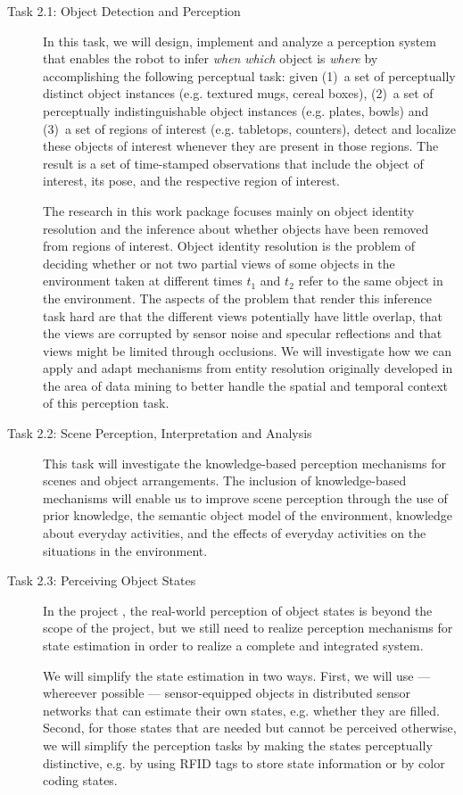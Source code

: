 \begin{description}
\item[Task 2.1: Object Detection and Perception] In this task, we will
  design, implement and analyze a perception system that enables
  the robot to infer \emph{when} \emph{which} object is \emph{where} by
  accomplishing the following perceptual task: given (1)~a set of
  perceptually distinct object instances (e.g. textured mugs, cereal boxes), 
  (2)~a set of perceptually indistinguishable object instances
  (e.g. plates, bowls) and (3)~a set of regions of interest (e.g. tabletops, counters),
  detect and localize these objects of interest whenever they are present in those regions.
  The result is a set of time-stamped observations that
  include the object of interest, its pose, and the respective region of
  interest.

  The research in this work package focuses mainly on object identity resolution 
  and the inference about whether objects have been removed from regions of interest.
  Object identity resolution is the problem of deciding whether or not two partial views
  of some objects in the environment taken at different times $t_1$ and
  $t_2$ refer to the same object in the environment. The aspects of the problem
  that render this inference task hard are that the different views potentially have
  little overlap, that the views are corrupted by sensor
  noise and specular reflections and that views might be limited
  through occlusions. We will investigate how we can apply and adapt
  mechanisms from entity resolution originally developed in the area of data
  mining to better handle the spatial and temporal context
  of this perception task.
\item[Task 2.2: Scene Perception, Interpretation and Analysis]
  This task will investigate the knowledge-based perception
  mechanisms for scenes and object arrangements. The inclusion of
  knowledge-based mechanisms will enable us to improve scene perception
  through the use of prior knowledge, the semantic object model of the
  environment, knowledge about everyday activities, and the effects of
  everyday activities on the situations in the environment.
\item[Task 2.3: Perceiving Object States]
  In the project \ksem, the real-world perception of object states is
  beyond the scope of the project, but we still need to realize
  perception mechanisms for state estimation in order to realize a
  complete and integrated system.

  We will simplify the state estimation in two ways. First, we will use
  --- whereever possible --- sensor-equipped objects in distributed sensor
  networks that can estimate their own states, e.g. whether they are
  filled.
  Second, for those states that are needed but cannot be perceived
  otherwise, we will simplify the perception tasks by making the states
  perceptually distinctive, e.g. by using RFID tags to store state
  information or by color coding states.
\end{description}

